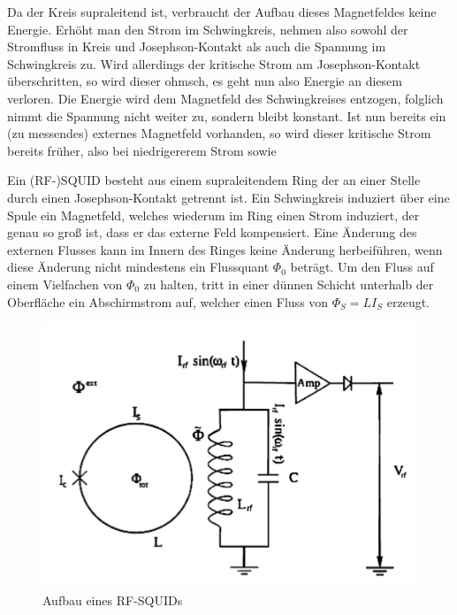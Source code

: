 Da der Kreis supraleitend ist, verbraucht der Aufbau dieses Magnetfeldes keine Energie. Erhöht man den Strom im Schwingkreis, nehmen also sowohl der Stromfluss in Kreis und Josephson-Kontakt als auch die Spannung im Schwingkreis zu. Wird allerdings der kritische Strom am Josephson-Kontakt überschritten, so wird dieser ohmsch, es geht nun also Energie an diesem verloren. Die Energie wird dem Magnetfeld des Schwingkreises entzogen, folglich nimmt die Spannung nicht weiter zu, sondern bleibt konstant. Ist nun bereits ein (zu messendes) externes Magnetfeld vorhanden, so wird dieser kritische Strom bereits früher, also bei niedrigererem Strom sowie   



 



















Ein (RF-)SQUID besteht aus einem supraleitendem Ring der an einer Stelle durch einen Josephson-Kontakt getrennt ist. Ein Schwingkreis induziert über eine Spule ein Magnetfeld, welches wiederum im Ring einen Strom induziert, der genau so groß ist, dass er das externe Feld kompensiert. Eine Änderung des externen Flusses kann im Innern des Ringes keine Änderung herbeiführen, wenn diese Änderung nicht mindestens ein Flussquant $\Phi_0$ beträgt. Um den Fluss auf einem Vielfachen von $\Phi_0$ zu halten, tritt in einer dünnen Schicht unterhalb der Oberfläche ein Abschirmstrom auf, welcher einen Fluss von $\Phi_S = LI_S$ erzeugt. 

\begin{figure}[H]
	\centering \includegraphics[width = 0.7 \textwidth]{Bilder/SQUID.jpg}
	\caption{Aufbau eines RF-SQUIDs}
\end{figure}

































